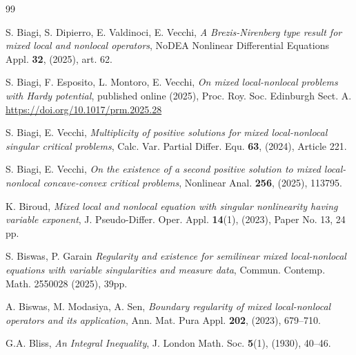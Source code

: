 \documentclass[11pt,a4paper]{amsart}
\theoremstyle{definition}
\theoremstyle{plain}
\numberwithin{equation}{section}
\begin{document}
{\begin{thebibliography}{99}
 
S. Biagi, S. Dipierro, E. Valdinoci, E. Vecchi,
{\em A Brezis-Nirenberg type result for mixed local and nonlocal operators}, 
 NoDEA Nonlinear Differential Equations Appl. {\bf 32}, (2025), art. 62.
 
S. Biagi, F. Esposito, L. Montoro, E. Vecchi,
{\em On mixed local-nonlocal problems with Hardy potential},
published online (2025), Proc. Roy. Soc. Edinburgh Sect. A. 
\url{https://doi.org/10.1017/prm.2025.28}


% 

S. Biagi, E. Vecchi,
{\em Multiplicity of positive solutions for mixed local-nonlocal singular critical problems}, 
Calc. Var. Partial Differ. Equ. {\bf 63}, (2024), Article 221.

S. Biagi, E. Vecchi,
{\em On the existence of a second positive solution to mixed local-nonlocal concave-convex critical problems}, 
Nonlinear Anal. {\bf 256}, (2025), 113795.


K. Biroud, 
{\em Mixed local and nonlocal equation with singular nonlinearity having variable exponent},
J. Pseudo-Differ. Oper. Appl. {\bf 14}(1), (2023), Paper No. 13, 24 pp.

S. Biswas, P. Garain
{\em Regularity and existence for semilinear mixed local-nonlocal equations with variable singularities and measure data},
Commun. Contemp. Math. 2550028 (2025), 39pp.

A. Biswas, M. Modasiya, A. Sen,
{\em Boundary regularity of mixed local-nonlocal operators and its application}, 
Ann. Mat. Pura Appl. {\bf 202}, (2023), 679--710.

G.A. Bliss,
{\em An Integral Inequality},
J. London Math. Soc. {\bf 5}(1), (1930), 40--46.


\end{thebibliography}}
\end{document}
